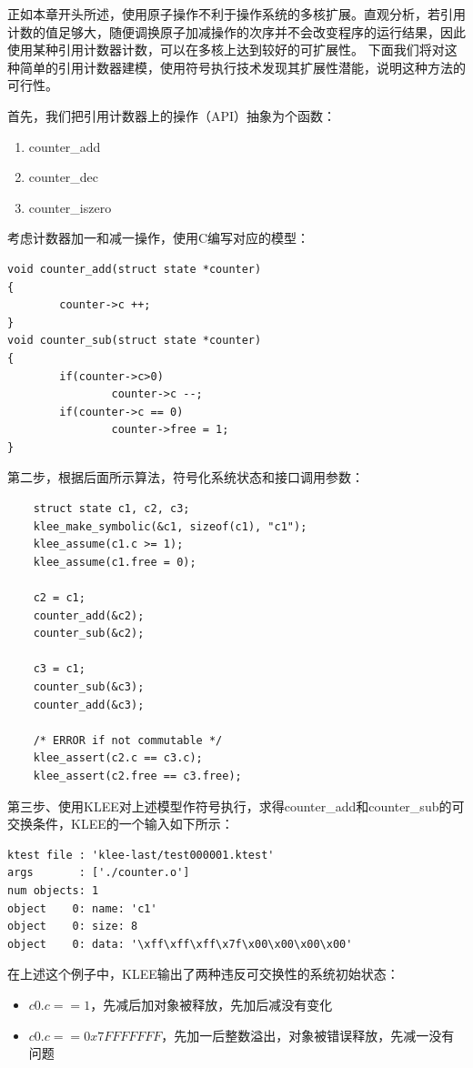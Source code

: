 正如本章开头所述，使用原子操作不利于操作系统的多核扩展。直观分析，若引用计数的值足够大，随便调换原子加减操作的次序并不会改变程序的运行结果，因此使用某种引用计数器计数，可以在多核上达到较好的可扩展性。
下面我们将对这种简单的引用计数器建模，使用符号执行技术发现其扩展性潜能，说明这种方法的可行性。

首先，我们把引用计数器上的操作（API）抽象为个函数：
\begin{enumerate}
\item counter\_add
\item counter\_dec
\item counter\_iszero
\end{enumerate}

考虑计数器加一和减一操作，使用C编写对应的模型：

\begin{lstlisting}
void counter_add(struct state *counter)
{
        counter->c ++;
}
void counter_sub(struct state *counter)
{
        if(counter->c>0)
                counter->c --;
        if(counter->c == 0)
                counter->free = 1;
}
\end{lstlisting}

第二步，根据后面\label{subsec:comm-alg}所示算法，符号化系统状态和接口调用参数：

\begin{lstlisting}
	struct state c1, c2, c3;
	klee_make_symbolic(&c1, sizeof(c1), "c1");
	klee_assume(c1.c >= 1);
	klee_assume(c1.free = 0);
	
	c2 = c1;
	counter_add(&c2);
	counter_sub(&c2);
	
	c3 = c1;
	counter_sub(&c3);
	counter_add(&c3);
	
	/* ERROR if not commutable */
	klee_assert(c2.c == c3.c);
	klee_assert(c2.free == c3.free);
\end{lstlisting}

第三步、使用KLEE对上述模型作符号执行，求得counter\_add和counter\_sub的可交换条件，KLEE的一个输入如下所示：

	\begin{lstlisting}[caption=KLEE输出样例]
ktest file : 'klee-last/test000001.ktest'
args       : ['./counter.o']
num objects: 1
object    0: name: 'c1'
object    0: size: 8
object    0: data: '\xff\xff\xff\x7f\x00\x00\x00\x00'
	\end{lstlisting}

在上述这个例子中，KLEE输出了两种违反可交换性的系统初始状态：
\begin{itemize}
	\item ${c0.c == 1}$，先减后加对象被释放，先加后减没有变化
	\item ${c0.c ==
		0x7FFFFFFF}$，先加一后整数溢出，对象被错误释放，先减一没有问题
\end{itemize}


